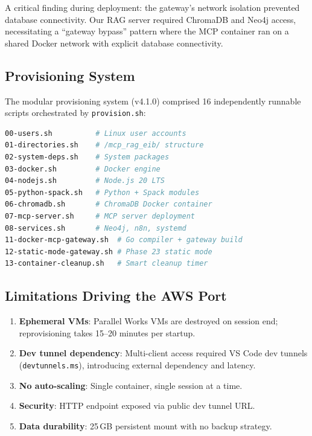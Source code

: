 \documentclass[11pt,letterpaper]{article}
\begin{document}
A critical finding during deployment: the gateway's network isolation
prevented database connectivity. Our RAG server required ChromaDB and Neo4j
access, necessitating a ``gateway bypass'' pattern where the MCP container
ran on a shared Docker network with explicit database connectivity.

\subsection{Provisioning System}

The modular provisioning system (v4.1.0) comprised 16 independently
runnable scripts orchestrated by \texttt{provision.sh}:

\begin{lstlisting}[language=bash,caption={Provisioning script inventory (abbreviated).}]
00-users.sh          # Linux user accounts
01-directories.sh    # /mcp_rag_eib/ structure
02-system-deps.sh    # System packages
03-docker.sh         # Docker engine
04-nodejs.sh         # Node.js 20 LTS
05-python-spack.sh   # Python + Spack modules
06-chromadb.sh       # ChromaDB Docker container
07-mcp-server.sh     # MCP server deployment
08-services.sh       # Neo4j, n8n, systemd
11-docker-mcp-gateway.sh  # Go compiler + gateway build
12-static-mode-gateway.sh # Phase 23 static mode
13-container-cleanup.sh   # Smart cleanup timer
\end{lstlisting}

\subsection{Limitations Driving the AWS Port}

\begin{enumerate}[noitemsep]
    \item \textbf{Ephemeral VMs}: Parallel Works VMs are destroyed on session
          end; reprovisioning takes 15--20 minutes per startup.
    \item \textbf{Dev tunnel dependency}: Multi-client access required VS Code
          dev tunnels (\texttt{devtunnels.ms}), introducing external dependency
          and latency.
    \item \textbf{No auto-scaling}: Single container, single session at a time.
    \item \textbf{Security}: HTTP endpoint exposed via public dev tunnel URL.
    \item \textbf{Data durability}: 25\,GB persistent mount with no backup strategy.
\end{enumerate}
\end{document}
